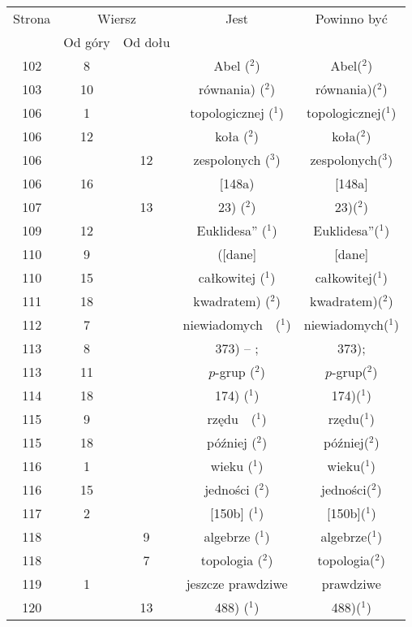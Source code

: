 \documentclass[a4paper,11pt]{article}
\begin{document}
\begin{center}
  \begin{tabular}{|c|c|c|c|c|}
    \hline
    Strona & \multicolumn{2}{c|}{Wiersz} & Jest
                              & Powinno być \\ \cline{2-3}
    & Od góry & Od dołu & & \\
    \hline
    102 &  8 & & Abel ($^{ 2 }$) & Abel($^{ 2 }$) \\
    103 & 10 & & równania) ($^{ 2 }$) & równania)($^{ 2 }$) \\
    106 &  1 & & topologicznej ($^{ 1 }$) & topologicznej($^{ 1 }$) \\
    106 & 12 & & koła ($^{ 2 }$) & koła($^{ 2 }$) \\
    106 & & 12 & zespolonych ($^{ 3 }$) & zespolonych($^{ 3 }$) \\
    106 & 16 & & [148a) & [148a] \\
    107 & & 13 & 23) ($^{ 2 }$) & 23)($^{ 2 }$) \\
    109 & 12 & & Euklidesa” ($^{ 1 }$) & Euklidesa”($^{ 1 }$) \\
    110 &  9 & & ([dane] & [dane] \\
    110 & 15 & & całkowitej ($^{ 1 }$) & całkowitej($^{ 1 }$) \\
    111 & 18 & & kwadratem) ($^{ 2 }$) & kwadratem)($^{ 2 }$) \\
    112 &  7 & & niewiadomych~~($^{ 1 }$) & niewiadomych($^{ 1 }$) \\
    113 &  8 & & 373) -- ; & 373); \\
    113 & 11 & & $p$-grup ($^{ 2 }$) & $p$-grup($^{ 2 }$) \\
    114 & 18 & & 174) ($^{ 1 }$) & 174)($^{ 1 }$) \\
    115 &  9 & & rzędu~~($^{ 1 }$) & rzędu($^{ 1 }$) \\
    115 & 18 & & później ($^{ 2 }$) & później($^{ 2 }$) \\
    116 &  1 & & wieku ($^{ 1 }$) & wieku($^{ 1 }$) \\
    116 & 15 & & jedności ($^{ 2 }$) & jedności($^{ 2 }$) \\
    117 &  2 & & [150b] ($^{ 1 }$) & [150b]($^{ 1 }$) \\
    118 & &  9 & algebrze ($^{ 1 }$) & algebrze($^{ 1 }$) \\
    118 & &  7 & topologia ($^{ 2 }$) & topologia($^{ 2 }$) \\
    119 &  1 & & jeszcze prawdziwe & prawdziwe \\
    120 & & 13 & 488) ($^{ 1 }$) & 488)($^{ 1 }$) \\

\end{tabular}
\end{center}
\end{document}
